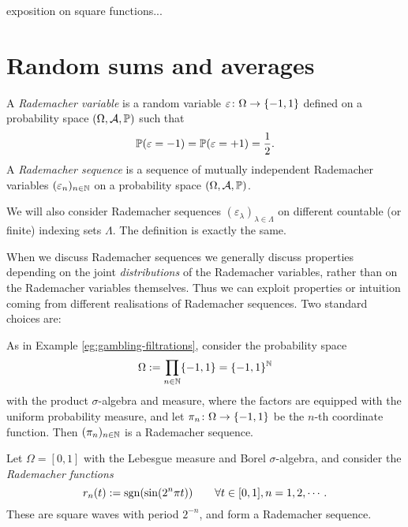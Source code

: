 {\color{blue} exposition on square functions...}

\section{Random sums and averages}

\begin{defn}
  A \emph{Rademacher variable} is a random variable $\map{\varepsilon}{\Omega}{\{-1, 1\}}$ defined on a probability space $(\Omega,\mc{A},\P)$ such that
  \begin{equation*}
    \P(\varepsilon = -1) = \P(\varepsilon = +1) = \frac{1}{2}.
  \end{equation*}
  A \emph{Rademacher sequence} is a sequence of mutually independent Rademacher variables $(\varepsilon_{n})_{n \in \N}$ on a probability space $(\Omega,\mc{A},\P)$.
\end{defn}

\begin{rmk}
  We will also consider Rademacher sequences $(\varepsilon_{\lambda})_{\lambda \in \Lambda}$ on different countable (or finite) indexing sets $\Lambda$.
  The definition is exactly the same.
\end{rmk}

When we discuss Rademacher sequences we generally discuss properties depending on the joint \emph{distributions} of the Rademacher variables, rather than on the Rademacher variables themselves.
Thus we can exploit properties or intuition coming from different realisations of Rademacher sequences.
Two standard choices are:

\begin{example}
  As in Example \ref{eg:gambling-filtrations}, consider the probability space
  \begin{equation*}
    \Omega := \prod_{n \in \N} \{-1,1\} = \{-1,1\}^{\N}
  \end{equation*}
  with the product $\sigma$-algebra and measure, where the factors are equipped with the uniform probability measure, and let $\map{\pi_{n}}{\Omega}{\{-1,1\}}$ be the $n$-th coordinate function.
  Then $(\pi_{n})_{n \in \N}$ is a Rademacher sequence.
\end{example}

\begin{example}
  Let $\Omega = [0,1]$ with the Lebesgue measure and Borel $\sigma$-algebra, and consider the \emph{Rademacher functions}
  \begin{equation*}
    r_n(t) := \sgn(\sin(2^n\pi t)) \qquad \forall t \in [0,1], n = 1,2,\cdots.
  \end{equation*}
  These are square waves with period $2^{-n}$, and form a Rademacher sequence.
\end{example}

